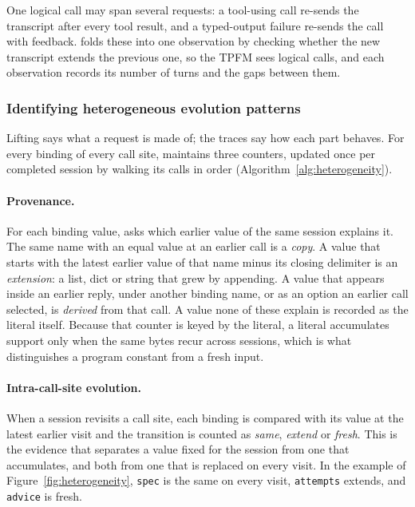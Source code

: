 One logical call may span several requests: a tool-using call re-sends the transcript after every tool result, and a typed-output failure re-sends the call with feedback. \sysname folds these into one observation by checking whether the new transcript extends the previous one, so the TPFM sees logical calls, and each observation records its number of turns and the gaps between them.

\subsubsection{Identifying heterogeneous evolution patterns}
\label{sec:evolution}

Lifting says what a request is made of; the traces say how each part behaves. For every binding of every call site, \sysname maintains three counters, updated once per completed session by walking its calls in order (Algorithm~\ref{alg:heterogeneity}).

\paragraph{Provenance.} For each binding value, \sysname asks which earlier value of the same session explains it. The same name with an equal value at an earlier call is a \emph{copy}. A value that starts with the latest earlier value of that name minus its closing delimiter is an \emph{extension}: a list, dict or string that grew by appending. A value that appears inside an earlier reply, under another binding name, or as an option an earlier call selected, is \emph{derived} from that call. A value none of these explain is recorded as the literal itself. Because that counter is keyed by the literal, a literal accumulates support only when the same bytes recur across sessions, which is what distinguishes a program constant from a fresh input.

\paragraph{Intra-call-site evolution.} When a session revisits a call site, each binding is compared with its value at the latest earlier visit and the transition is counted as \emph{same}, \emph{extend} or \emph{fresh}. This is the evidence that separates a value fixed for the session from one that accumulates, and both from one that is replaced on every visit. In the example of Figure~\ref{fig:heterogeneity}, \texttt{spec} is the same on every visit, \texttt{attempts} extends, and \texttt{advice} is fresh.

